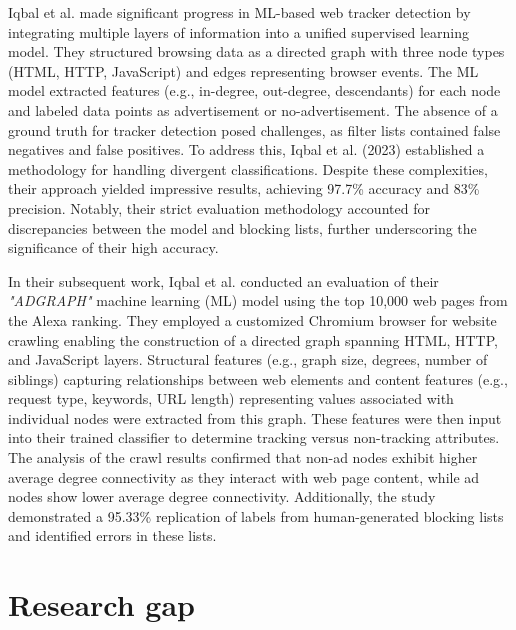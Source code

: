 Iqbal et al. \cite{iqbal2018adgraph} made significant progress in ML-based web tracker detection by integrating multiple layers of information
into a unified supervised learning model. They structured browsing data as a directed graph with three node types
(HTML, HTTP, JavaScript) and edges representing browser events. The ML model extracted features (e.g., in-degree, out-degree, descendants)
for each node and labeled data points as advertisement or no-advertisement. The absence of a ground truth for tracker detection
posed challenges, as filter lists contained false negatives and false positives. To address this, Iqbal et al. (2023) established 
a methodology for handling divergent classifications. Despite these complexities, their approach yielded impressive results,
achieving 97.7\% accuracy and 83\% precision. Notably, their strict evaluation methodology accounted for discrepancies between
the model and blocking lists, further underscoring the significance of their high accuracy.

In their subsequent work, Iqbal et al. \cite{iqbal2020adgraph} conducted an evaluation of their \emph{"ADGRAPH"} \cite{adgraph} machine learning (ML) model
using the top 10,000 web pages from the Alexa ranking. They employed a customized Chromium browser for website
crawling enabling the construction of a directed graph spanning HTML, HTTP, and
JavaScript layers. Structural features (e.g., graph size, degrees, number of siblings) capturing relationships between web
elements and content features (e.g., request type, keywords, URL length) representing values associated with individual
nodes were extracted from this graph. These features were then input into their trained classifier to determine tracking
versus non-tracking attributes. The analysis of the crawl results confirmed that non-ad nodes exhibit higher average
degree connectivity as they interact with web page content, while ad nodes show lower average degree connectivity.
Additionally, the study demonstrated a 95.33\% replication of labels from human-generated blocking lists and identified errors
in these lists.

\section{Research gap}

